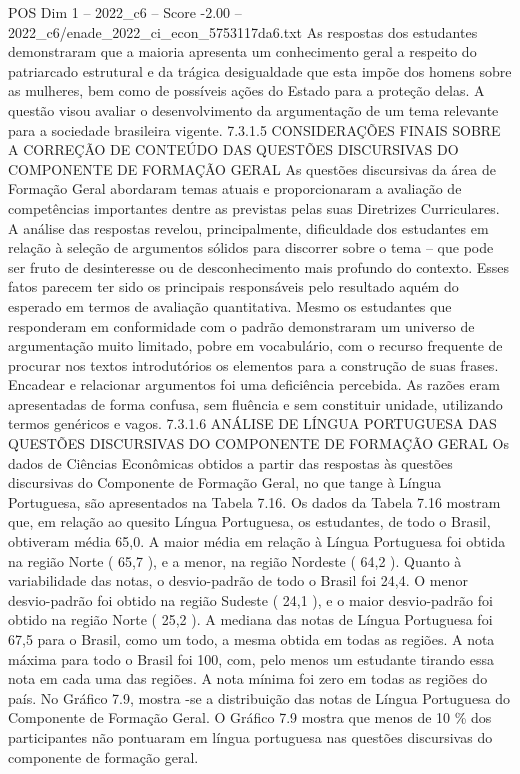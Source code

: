 \begin{textsample}{POS Dim 1 – 2022\_c6 – Score -2.00 – 2022\_c6/enade\_2022\_ci\_econ\_5753117da6.txt}
As respostas dos estudantes demonstraram que a maioria apresenta um conhecimento geral a respeito do patriarcado estrutural e da trágica desigualdade que esta impõe dos homens sobre as mulheres, bem como de possíveis ações do Estado para a proteção delas.
A questão visou avaliar o desenvolvimento da argumentação de um tema relevante para a sociedade brasileira vigente. 7.3.1.5 CONSIDERAÇÕES FINAIS SOBRE A CORREÇÃO DE CONTEÚDO DAS QUESTÕES DISCURSIVAS DO COMPONENTE DE FORMAÇÃO GERAL As questões discursivas da área de Formação Geral abordaram temas atuais e proporcionaram a avaliação de competências importantes dentre as previstas pelas suas Diretrizes Curriculares.
A análise das respostas revelou, principalmente, dificuldade dos estudantes em relação à seleção de argumentos sólidos para discorrer sobre o tema – que pode ser fruto de desinteresse ou de desconhecimento mais profundo do contexto.
Esses fatos parecem ter sido os principais responsáveis pelo resultado aquém do esperado em termos de avaliação quantitativa.
Mesmo os estudantes que responderam em conformidade com o padrão demonstraram um universo de argumentação muito limitado, pobre em vocabulário, com o recurso frequente de procurar nos textos introdutórios os elementos para a construção de suas frases.
Encadear e relacionar argumentos foi uma deficiência percebida.
As razões eram apresentadas de forma confusa, sem fluência e sem constituir unidade, utilizando termos genéricos e vagos. 7.3.1.6 ANÁLISE DE LÍNGUA PORTUGUESA DAS QUESTÕES DISCURSIVAS DO COMPONENTE DE FORMAÇÃO GERAL Os dados de Ciências Econômicas obtidos a partir das respostas às questões discursivas do Componente de Formação Geral, no que tange à Língua Portuguesa, são apresentados na Tabela 7.16.
Os dados da Tabela 7.16 mostram que, em relação ao quesito Língua Portuguesa, os estudantes, de todo o Brasil, obtiveram média 65,0.
A maior média em relação à Língua Portuguesa foi obtida na região Norte ( 65,7 ), e a menor, na região Nordeste ( 64,2 ).
Quanto à variabilidade das notas, o desvio-padrão de todo o Brasil foi 24,4.
O menor desvio-padrão foi obtido na região Sudeste ( 24,1 ), e o maior desvio-padrão foi obtido na região Norte ( 25,2 ).
A mediana das notas de Língua Portuguesa foi 67,5 para o Brasil, como um todo, a mesma obtida em todas as regiões.
A nota máxima para todo o Brasil foi 100, com, pelo menos um estudante tirando essa nota em cada uma das regiões.
A nota mínima foi zero em todas as regiões do país.
No Gráfico 7.9, mostra -se a distribuição das notas de Língua Portuguesa do Componente de Formação Geral.
O Gráfico 7.9 mostra que menos de 10 \% dos participantes não pontuaram em língua portuguesa nas questões discursivas do componente de formação geral.

\end{textsample}
